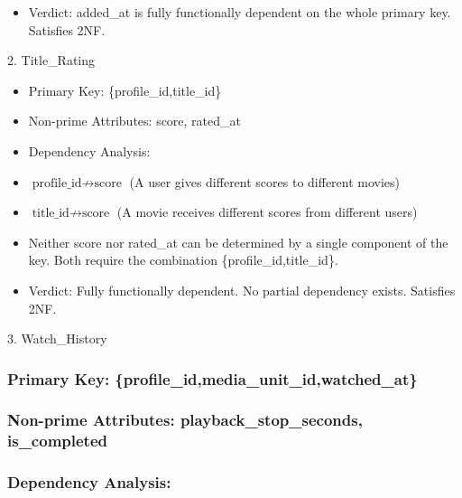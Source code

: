 \begin{itemize}
\item
  Verdict: added\_\allowbreak{}at is fully functionally dependent on the whole primary key. Satisfies 2NF.
\end{itemize}

2. Title\_\allowbreak{}Rating

\begin{itemize}
\item
  Primary Key: \{profile\_\allowbreak{}id,title\_\allowbreak{}id\}
\item
  Non-prime Attributes: score, rated\_\allowbreak{}at
\item
  Dependency Analysis:
\end{itemize}

\begin{itemize}
\item
  \({\text{profile\_id}} \not\to \text{score}\) (A user gives different scores to different movies)
\item
  \({\text{title\_id}} \not\to \text{score}\) (A movie receives different scores from different users)
\item
  Neither score nor rated\_\allowbreak{}at can be determined by a single component of the key. Both require the combination \{profile\_\allowbreak{}id,title\_\allowbreak{}id\}.
\end{itemize}

\begin{itemize}
\item
  Verdict: Fully functionally dependent. No partial dependency exists. Satisfies 2NF.
\end{itemize}

3. Watch\_\allowbreak{}History

\subsubsection{Primary Key: \{profile\_\allowbreak{}id,media\_\allowbreak{}unit\_\allowbreak{}id,watched\_\allowbreak{}at\}}\label{primary-key-profile_idmedia_unit_idwatched_at}

\subsubsection{Non-prime Attributes: playback\_\allowbreak{}stop\_\allowbreak{}seconds, is\_\allowbreak{}completed}\label{non-prime-attributes-playback_stop_seconds-is_completed}

\subsubsection{Dependency Analysis:}\label{dependency-analysis}

